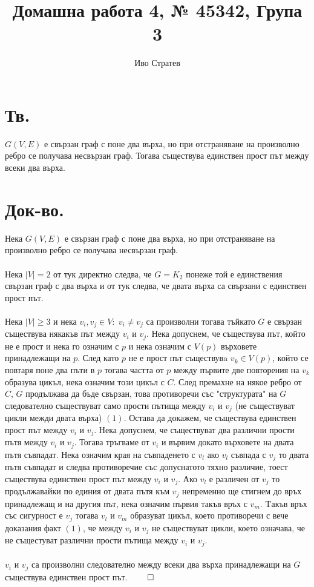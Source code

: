 \documentclass[17pt]{extarticle}
\title{Домашна работа 4, № 45342, Група 3}
\author{Иво Стратев}
\begin{document}
    \maketitle
    \section*{Тв.}
    \(G(V, E)\) е свързан граф с поне два върха, но при отстраняване на произволно ребро се получава несвързан граф.
    Тогава съществува единствен прост път между всеки два върха.
    \section*{Док-во.}
    Нека \(G(V, E)\) е свързан граф с поне два върха, но при отстраняване на произволно ребро се получава несвързан граф. \\\\
    Нека \(|V| = 2\) от тук директно следва, че \(G = K_2\) понеже той е единствения свързан граф с два върха и от тук следва, че двата върха са свързани с единствен прост път. \\\\    
    Нека \(|V| \geq 3\) и нека \(v_i, v_j \in V : \; v_i \neq v_j\) са произволни тогава тъйкато \(G\) е свързан съществува някакъв път между \(v_i\) и \(v_j\). Нека допуснем,
    че съществува път, който не е прост и нека го означим с \(p\) и нека означим с \(V(p)\) върховете принадлежащи на \(p\). След като \(p\) не е прост път
    съществувa \(v_k \in V(p)\), който се повтаря поне два пъти в \(p\) тогава частта от \(p\) между първите две повторения на \(v_k\)
    образува цикъл, нека означим този цикъл с \(C\). След премахне на някое ребро от \(C\), \(G\) продължава да бъде свързан,
    това противоречи със "структурата" на \(G\) следователно съществуват само прости пътища между \(v_i\) и \(v_j\) (не съществуват цикли межди двата върха) \((1)\).
    Остава да докажем, че съществува единствен прост път между \(v_i\) и \(v_j\). Нека допуснем, че съществуват два различни
    прости пътя между \(v_i\) и \(v_j\). Тогава тръгваме от \(v_i\) и вървим докато върховете на двата пътя съвпадат. Нека означим
    края на съвпаденето с \(v_l\) ако \(v_l\) съвпада с \(v_j\) то двата пътя съвпадат и следва противоречие със допуснатото тяхно различие,
    тоест съществува единствен прост път между \(v_i\) и \(v_j\). Ако \(v_l\) е различен от \(v_j\) то продължавайки по единия от двата пътя към \(v_j\)
    непременно ще стигнем до връх принадлежащ и на другия път, нека означим първия такъв връх с \(v_m\). Tакъв връх със сигурност е \(v_j\) тогава \(v_l\) и \(v_m\) образуват
    цикъл, което противоречи с вече доказания факт \((1)\), че между \(v_i\) и \(v_j\) не съществуват цикли, което означава, че не същестуват различни
    прости пътища между \(v_i\) и \(v_j\). \\\\
    \(v_i\) и \(v_j\) са произволни следователно между всеки два върха принадлежащи на \(G\) съществува единствен прост път. \(\qed\)
 
\end{document}
